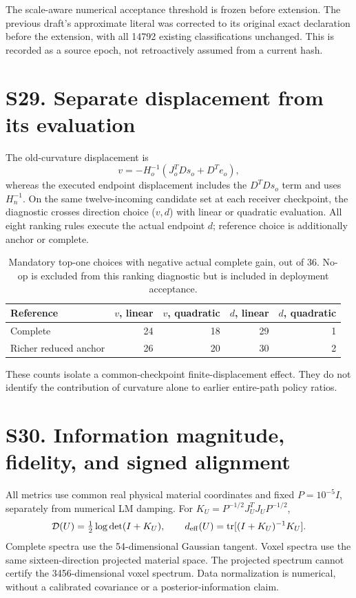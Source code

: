 The scale-aware numerical acceptance threshold is frozen before extension. The previous draft's approximate literal was corrected to its original exact declaration before the extension, with all 14792 existing classifications unchanged. This is recorded as a source epoch, not retroactively assumed from a current hash.

\section*{S29. Separate displacement from its evaluation}
The old-curvature displacement is
\[
v=-H_o^{-1}(J_o^TDs_o+D^Te_o),
\]
whereas the executed endpoint displacement includes the $D^TDs_o$ term and uses $H_n^{-1}$. On the same twelve-incoming candidate set at each receiver checkpoint, the diagnostic crosses direction choice ($v,d$) with linear or quadratic evaluation. All eight ranking rules execute the actual endpoint $d$; reference choice is additionally anchor or complete.

\begin{table}[htbp]\centering\caption{Mandatory top-one choices with negative actual complete gain, out of 36. No-op is excluded from this ranking diagnostic but is included in deployment acceptance.}
\begin{tabular}{@{}lrrrr@{}}\toprule
Reference&$v$, linear&$v$, quadratic&$d$, linear&$d$, quadratic\\\midrule
Complete&24&18&29&1\\
Richer reduced anchor&26&20&30&2\\\bottomrule
\end{tabular}\end{table}
These counts isolate a common-checkpoint finite-displacement effect. They do not identify the contribution of curvature alone to earlier entire-path policy ratios.

\section*{S30. Information magnitude, fidelity, and signed alignment}
All metrics use common real physical material coordinates and fixed $P=10^{-5}I$, separately from numerical LM damping. For $K_U=P^{-1/2}J_U^TJ_UP^{-1/2}$,
\[
\mathcal D(U)=\tfrac12\log\det(I+K_U),\qquad
d_{\rm eff}(U)=\operatorname{tr}[(I+K_U)^{-1}K_U].
\]
Complete spectra use the 54-dimensional Gaussian tangent. Voxel spectra use the same sixteen-direction projected material space. The projected spectrum cannot certify the 3456-dimensional voxel spectrum. Data normalization is numerical, without a calibrated covariance or a posterior-information claim.

